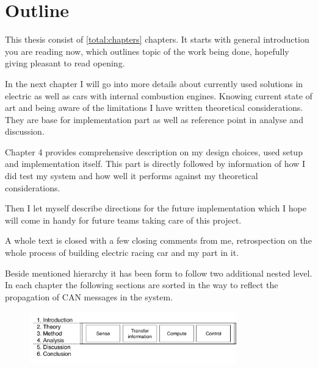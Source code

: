 

\section{Outline}
This thesis consist of \ref{total:chapters} chapters. It starts with general introduction you are reading now, which outlines topic of the work being done, hopefully giving pleasant to read opening. 

In the next chapter I will go into more details about currently used solutions in electric as well as cars with internal combustion engines. Knowing current state of art and being aware of the limitations I have written theoretical considerations. They are base for implementation part as well as reference point in analyse and discussion.

Chapter 4 provides comprehensive description on my design choices, used setup and implementation itself. This part is directly followed by information of how I did test my system and how well it performs against my theoretical considerations.

Then I let myself describe directions for the future implementation which I hope will come in handy for future teams taking care of this project.

A whole text is closed with a few closing comments from me, retrospection on the whole process of building electric racing car and my part in it.

Beside mentioned hierarchy it has been form to follow two additional nested level. In each chapter the following sections are sorted in the way to reflect the propagation of CAN messages in the system.

\begin{figure}[h]
    \centering
            \includegraphics[width=0.8\textwidth]{figures/Outline}
            \label{outline}
\end{figure}